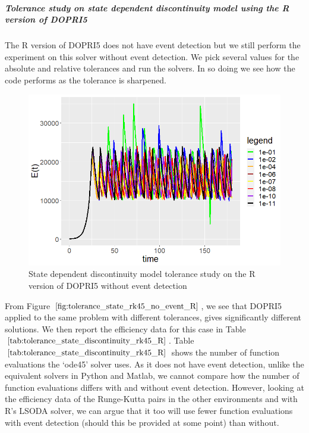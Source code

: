 \subparagraph{Tolerance study on state dependent discontinuity model using the R version of DOPRI5}
The R version of DOPRI5 does not have event detection but we still perform the experiment on this solver without event detection. We pick several values for the absolute and relative tolerances and run the solvers. In so doing we see how the code performs as the tolerance is sharpened. 

\begin{figure}[h]
\centering
\includegraphics[width=0.7\linewidth]{./figures/tolerance_state_rk45_no_event_R}
\caption{State dependent discontinuity model tolerance study on the R version of DOPRI5 without event detection}
\label{fig:tolerance_state_rk45_no_event_R}
\end{figure}

From Figure $\ref{fig:tolerance_state_rk45_no_event_R}$, we see that DOPRI5 applied to the same problem with different tolerances, gives significantly different solutions. We then report the efficiency data for this case in Table $\ref{tab:tolerance_state_discontinuity_rk45_R}$. Table $\ref{tab:tolerance_state_discontinuity_rk45_R}$ shows the number of function evaluations the `ode45' solver uses. As it does not have event detection, unlike the equivalent solvers in Python and Matlab, we cannot compare how the number of function evaluations differs with and without event detection. However, looking at the efficiency data of the Runge-Kutta pairs in the other environments and with R's LSODA solver, we can argue that it too will use fewer function evaluations with event detection (should this be provided at some point) than without.

